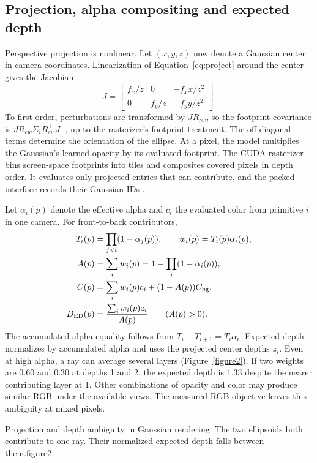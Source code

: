 \subsection{Projection, alpha compositing and expected depth}
Perspective projection is nonlinear. Let $(x,y,z)$ now denote a Gaussian center in camera coordinates. Linearization of Equation~\ref{eq:project} around the center gives the Jacobian
\begin{equation}
 J=\begin{bmatrix}
 f_x/z &0&-f_xx/z^2\\
 0&f_y/z&-f_yy/z^2
 \end{bmatrix}.
\end{equation}
To first order, perturbations are transformed by $JR_{cw}$, so the footprint covariance is $JR_{cw}\Sigma_i R_{cw}^{\top}J^\top$, up to the rasterizer's footprint treatment. The off-diagonal terms determine the orientation of the ellipse. At a pixel, the model multiplies the Gaussian's learned opacity by its evaluated footprint. The CUDA rasterizer bins screen-space footprints into tiles and composites covered pixels in depth order. It evaluates only projected entries that can contribute, and the packed interface records their Gaussian IDs \cite{ref5}.

Let $\alpha_i(p)$ denote the effective alpha and $c_i$ the evaluated color from primitive $i$ in one camera. For front-to-back contributors,
\begin{align}
 T_i(p)&=\prod_{j<i}(1-\alpha_j(p)),\qquad w_i(p)=T_i(p)\alpha_i(p),\\
 A(p)&=\sum_i w_i(p)=1-\prod_i(1-\alpha_i(p)),\\
 C(p)&=\sum_i w_i(p)c_i+(1-A(p))C_{\rm bg},\\
 D_{\rm ED}(p)&=\frac{\sum_i w_i(p)z_i}{A(p)}\qquad (A(p)>0).
 \label{eq:expected-depth}
\end{align}
The accumulated alpha equality follows from $T_i-T_{i+1}=T_i\alpha_i$. Expected depth normalizes by accumulated alpha and uses the projected center depths $z_i$. Even at high alpha, a ray can average several layers (Figure~\ref{figure2}). If two weights are 0.60 and 0.30 at depths 1 and 2, the expected depth is $1.33$ despite the nearer contributing layer at 1. Other combinations of opacity and color may produce similar RGB under the available views. The measured RGB objective leaves this ambiguity at mixed pixels.

  {Projection and depth ambiguity in Gaussian rendering. The two ellipsoids both contribute to one ray. Their normalized expected depth falls between them.}{figure2}

